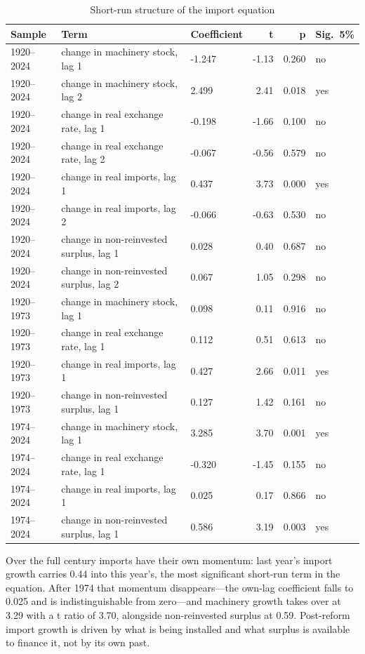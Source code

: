 \documentclass[11pt]{article}
\begin{document}
\begin{table}[H]
\centering
\caption{Short-run structure of the import equation}
\begin{tabular}{p{2.2cm}p{4.6cm}p{2.2cm}rrp{1.8cm}}
\toprule
\textbf{Sample} & \textbf{Term} & \textbf{Coefficient} & \textbf{t} & \textbf{p} & \textbf{Sig.\ 5\%} \\
\midrule
1920--2024 & change in machinery stock, lag 1 & -1.247 & -1.13 & 0.260 & no \\
1920--2024 & change in machinery stock, lag 2 & 2.499 & 2.41 & 0.018 & yes \\
1920--2024 & change in real exchange rate, lag 1 & -0.198 & -1.66 & 0.100 & no \\
1920--2024 & change in real exchange rate, lag 2 & -0.067 & -0.56 & 0.579 & no \\
1920--2024 & change in real imports, lag 1 & 0.437 & 3.73 & 0.000 & yes \\
1920--2024 & change in real imports, lag 2 & -0.066 & -0.63 & 0.530 & no \\
1920--2024 & change in non-reinvested surplus, lag 1 & 0.028 & 0.40 & 0.687 & no \\
1920--2024 & change in non-reinvested surplus, lag 2 & 0.067 & 1.05 & 0.298 & no \\
1920--1973 & change in machinery stock, lag 1 & 0.098 & 0.11 & 0.916 & no \\
1920--1973 & change in real exchange rate, lag 1 & 0.112 & 0.51 & 0.613 & no \\
1920--1973 & change in real imports, lag 1 & 0.427 & 2.66 & 0.011 & yes \\
1920--1973 & change in non-reinvested surplus, lag 1 & 0.127 & 1.42 & 0.161 & no \\
1974--2024 & change in machinery stock, lag 1 & 3.285 & 3.70 & 0.001 & yes \\
1974--2024 & change in real exchange rate, lag 1 & -0.320 & -1.45 & 0.155 & no \\
1974--2024 & change in real imports, lag 1 & 0.025 & 0.17 & 0.866 & no \\
1974--2024 & change in non-reinvested surplus, lag 1 & 0.586 & 3.19 & 0.003 & yes \\
\bottomrule
\end{tabular}
\end{table}

Over the full century imports have their own momentum: last year's import growth carries 0.44 into this year's, the most significant short-run term in the equation. After 1974 that momentum disappears---the own-lag coefficient falls to 0.025 and is indistinguishable from zero---and machinery growth takes over at 3.29 with a t ratio of 3.70, alongside non-reinvested surplus at 0.59. Post-reform import growth is driven by what is being installed and what surplus is available to finance it, not by its own past.
\end{document}
